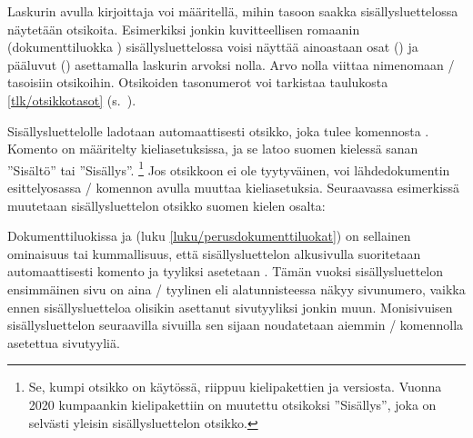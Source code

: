 \begin{koodilohkosis}
\tableofcontents
\end{koodilohkosis}

Laskurin  avulla kirjoittaja voi määritellä, mihin
tasoon saakka sisällysluettelossa näytetään otsikoita. Esimerkiksi
jonkin kuvitteellisen romaanin (dokumenttiluokka )
sisällysluettelossa voisi näyttää ainoastaan osat () ja
pääluvut () asettamalla laskurin arvoksi nolla. Arvo
nolla viittaa nimenomaan \-/ tasoisiin otsikoihin.
Otsikoiden tasonumerot voi tarkistaa taulukosta \ref{tlk/otsikkotasot}
(s.~\pageref{tlk/otsikkotasot}).

\begin{koodilohkosis}
\setcounter{tocdepth}{0}
\end{koodilohkosis}

Sisällysluettelolle ladotaan automaattisesti otsikko, joka tulee
komennosta . Komento on määritelty
kieliasetuksissa, ja se latoo suomen kielessä sanan ''Sisältö'' tai
''Sisällys''.%
\footnote{Se, kumpi otsikko on käytössä, riippuu kielipakettien
   ja  versiosta. Vuonna 2020
  kumpaankin kielipakettiin on muutettu otsikoksi ''Sisällys'', joka on
  selvästi yleisin sisällysluettelon otsikko.} Jos otsikkoon ei ole
tyytyväinen, voi lähdedokumentin esittelyosassa \-/
komennon avulla muuttaa kieliasetuksia. Seuraavassa esimerkissä
muutetaan sisällysluettelon otsikko suomen kielen osalta:

\begin{koodilohkosis}
\addto{\captionsfinnish}{
  \renewcommand{\contentsname}{Sisällysluettelo}
}
\end{koodilohkosis}

Dokumenttiluokissa  ja  (luku
\ref{luku/perusdokumenttiluokat}) on sellainen ominaisuus tai
kummallisuus, että sisällysluettelon alkusivulla suoritetaan
automaattisesti komento  ja tyyliksi asetetaan
. Tämän vuoksi sisällysluettelon ensimmäinen sivu on aina
\-/ tyylinen eli alatunnisteessa näkyy sivunumero, vaikka
ennen sisällysluetteloa olisikin asettanut sivutyyliksi jonkin muun.
Monisivuisen sisällysluettelon seuraavilla sivuilla sen sijaan
noudatetaan aiemmin \-/ komennolla asetettua
sivutyyliä.

